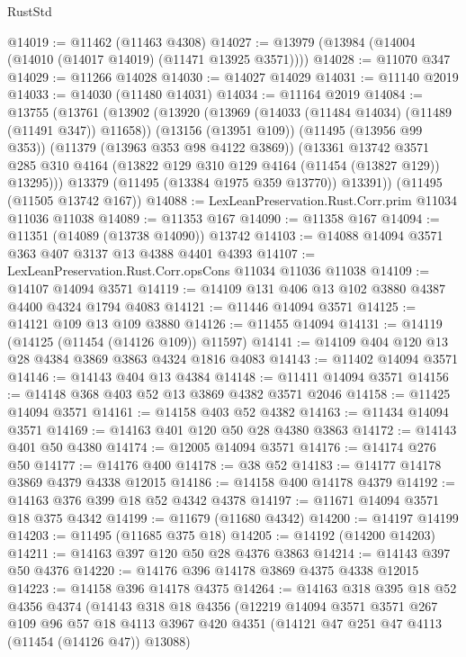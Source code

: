 \begin{lexlean}{RustStd}
\begin{coremodule}
@14019 := @11462 (@11463 @4308)
@14027 := @13979 (@13984 (@14004 (@14010 (@14017 @14019) (@11471 @13925 @3571))))
@14028 := @11070 @347
@14029 := @11266 @14028
@14030 := @14027 @14029
@14031 := @11140 @2019
@14033 := @14030 (@11480 @14031)
@14034 := @11164 @2019
@14084 := @13755
    (@13761
      (@13902
        (@13920
          (@13969 (@14033 (@11484 @14034) (@11489 (@11491 @347)) @11658))
          (@13156 (@13951 @109))
          (@11495 (@13956 @99 @353))
          (@11379 (@13963 @353 @98 @4122 @3869))
          (@13361
            @13742
            @3571
            @285
            @310
            @4164
            (@13822 @129 @310 @129 @4164 (@11454 (@13827 @129)) @13295)))
        @13379
        (@11495 (@13384 @1975 @359 @13770))
        @13391))
    (@11495 (@11505 @13742 @167))
@14088 := LexLeanPreservation.Rust.Corr.prim @11034 @11036 @11038
@14089 := @11353 @167
@14090 := @11358 @167
@14094 := @11351 (@14089 (@13738 @14090)) @13742
@14103 := @14088 @14094 @3571 @363 @407 @3137 @13 @4388 @4401 @4393
@14107 := LexLeanPreservation.Rust.Corr.opsCons @11034 @11036 @11038
@14109 := @14107 @14094 @3571
@14119 := @14109 @131 @406 @13 @102 @3880 @4387 @4400 @4324 @1794 @4083
@14121 := @11446 @14094 @3571
@14125 := @14121 @109 @13 @109 @3880
@14126 := @11455 @14094
@14131 := @14119 (@14125 (@11454 (@14126 @109)) @11597)
@14141 := @14109 @404 @120 @13 @28 @4384 @3869 @3863 @4324 @1816 @4083
@14143 := @11402 @14094 @3571
@14146 := @14143 @404 @13 @4384
@14148 := @11411 @14094 @3571
@14156 := @14148 @368 @403 @52 @13 @3869 @4382 @3571 @2046
@14158 := @11425 @14094 @3571
@14161 := @14158 @403 @52 @4382
@14163 := @11434 @14094 @3571
@14169 := @14163 @401 @120 @50 @28 @4380 @3863
@14172 := @14143 @401 @50 @4380
@14174 := @12005 @14094 @3571
@14176 := @14174 @276 @50
@14177 := @14176 @400
@14178 := @38 @52
@14183 := @14177 @14178 @3869 @4379 @4338 @12015
@14186 := @14158 @400 @14178 @4379
@14192 := @14163 @376 @399 @18 @52 @4342 @4378
@14197 := @11671 @14094 @3571 @18 @375 @4342
@14199 := @11679 (@11680 @4342)
@14200 := @14197 @14199
@14203 := @11495 (@11685 @375 @18)
@14205 := @14192 (@14200 @14203)
@14211 := @14163 @397 @120 @50 @28 @4376 @3863
@14214 := @14143 @397 @50 @4376
@14220 := @14176 @396 @14178 @3869 @4375 @4338 @12015
@14223 := @14158 @396 @14178 @4375
@14264 := @14163
    @318
    @395
    @18
    @52
    @4356
    @4374
    (@14143
      @318
      @18
      @4356
      (@12219
        @14094
        @3571
        @3571
        @267
        @109
        @96
        @57
        @18
        @4113
        @3967
        @420
        @4351
        (@14121 @47 @251 @47 @4113 (@11454 (@14126 @47)) @13088)

\end{coremodule}
\end{lexlean}
